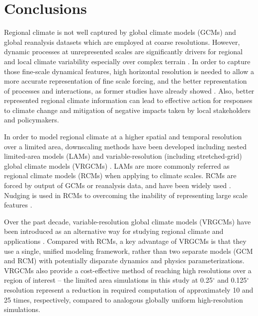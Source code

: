 \chapter{Conclusions}

Regional climate is not well captured by global climate models (GCMs) and global reanalysis datasets which are employed at coarse resolutions. However, dynamic processes at unrepresented scales are significantly drivers for regional and local climate variability especially over complex terrain \cite{soares2012wrf}. In order to capture those fine-scale dynamical features, high horizontal resolution is needed to allow a more accurate representation of fine scale forcing, and the better representation of processes and interactions, as former studies have already showed \cite{leung2003regional, rauscher2010resolution}. Also, better represented regional climate information can lead to effective action for responses to climate change and mitigation of negative impacts taken by local stakeholders and policymakers.

In order to model regional climate at a higher spatial and temporal resolution over a limited area, downscaling methods have been developed including nested limited-area models (LAMs) and variable-resolution (including stretched-grid) global climate models (VRGCMs) \cite{laprise2008challenging}. LAMs are more commonly referred as regional climate models (RCMs) when applying to climate scales. RCMs are forced by output of GCMs or reanalysis data, and have been widely used \cite{christensen2007regional, bukovsky2009precipitation, caldwell2009evaluation, mearns2012north}. Nudging is used in RCMs to overcoming the inability of representing large scale features \cite{laprise2008regional}.

Over the past decade, variable-resolution global climate models (VRGCMs) have been introduced as an alternative way for studying regional climate and applications \cite{fox1997finite, fox2006variable, ringler2008multiresolution, skamarock2012multiscale, rauscher2013exploring, zarzycki2015effects}. Compared with RCMs, a key advantage of VRGCMs is that they use a single, unified modeling framework, rather than two separate models (GCM and RCM) with potentially disparate dynamics and physics parameterizations. VRGCMs also provide a cost-effective method of reaching high resolutions over a region of interest -- the limited area simulations in this study at 0.25$^\circ$ and 0.125$^\circ$ resolution represent a reduction in required computation of approximately 10 and 25 times, respectively, compared to analogous globally uniform high-resolution simulations. 

